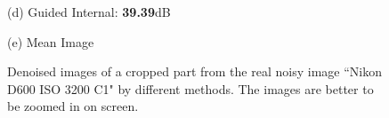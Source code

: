 \documentclass[10pt,twocolumn,letterpaper]{article}
\begin{document}
\begin{figure}
{\begin{minipage}[t]{0.195\textwidth}
{\footnotesize (d) Guided Internal: \textbf{39.39}dB }
\end{minipage}
\begin{minipage}[t]{0.195\textwidth}
\centering
{}
{\footnotesize (e) Mean Image \cite{crosschannel2016}}
\end{minipage}
}
\vspace{-2mm}
\caption{Denoised images of a cropped part from the real noisy image ``Nikon D600 ISO 3200 C1" \cite{crosschannel2016} by different methods. The 
\vspace{-0.5mm}
images are better to be zoomed in on screen.}
\vspace{-1mm}
\label{fig4}
\end{figure}
\end{document}

